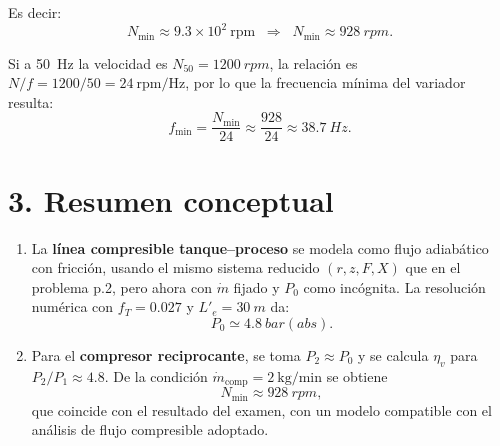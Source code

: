 \documentclass[11pt,a4paper]{article}
\begin{document}
Es decir:
\[
\boxed{N_{\min} \approx 9.3\times10^2\ \mathrm{rpm}
\;\;\Longrightarrow\;\;
N_{\min} \approx \SI{928}{rpm}.}
\]

Si a \SI{50}{Hz} la velocidad es $N_{50} = \SI{1200}{rpm}$,
la relación es $N/f = 1200/50 = 24\ \mathrm{rpm/Hz}$, por lo que la frecuencia mínima del variador resulta:
\[
f_{\min} = \frac{N_{\min}}{24}
         \approx \frac{928}{24}
         \approx \SI{38.7}{Hz}.
\]

\section*{3. Resumen conceptual}

\begin{enumerate}
  \item La \textbf{línea compresible tanque--proceso} se modela como flujo adiabático con fricción, usando el mismo sistema reducido $(r,z,F,X)$ que en el problema p.2, pero ahora con $\dot m$ fijado y $P_0$ como incógnita. La resolución numérica con $f_T = 0.027$ y $L'_e = \SI{30}{m}$ da:
  \[
  P_0 \simeq \SI{4.8}{bar(abs)}.
  \]

  \item Para el \textbf{compresor reciprocante}, se toma $P_2 \approx P_0$ y se calcula $\eta_v$ para $P_2/P_1 \approx 4.8$. De la condición $\dot m_{\text{comp}} = 2\ \mathrm{kg/min}$ se obtiene
  \[
  N_{\min} \approx \SI{928}{rpm},
  \]
  que coincide con el resultado del examen, con un modelo compatible con el análisis de flujo compresible adoptado.
\end{enumerate}
\end{document}
